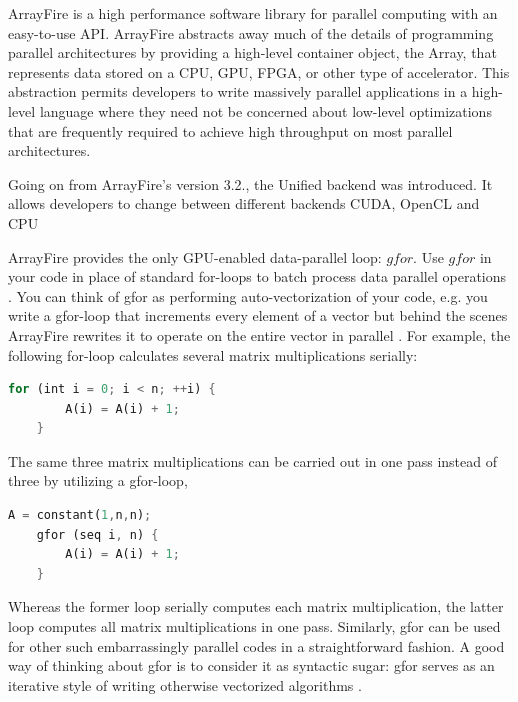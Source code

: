 ArrayFire is a high performance software library for parallel computing with an easy-to-use API. ArrayFire abstracts away much of the details of programming parallel architectures by providing a high-level container object, the Array, that represents data stored on a CPU, GPU, FPGA, or other type of accelerator. This abstraction permits developers to write massively parallel applications in a high-level language where they need not be concerned about low-level optimizations that are frequently required to achieve high throughput on most parallel architectures.

\citep{Yalamanchili2015}

Going on from ArrayFire's version 3.2., the Unified backend was introduced. It allows developers to change between different backends CUDA, OpenCL and CPU

ArrayFire provides the only GPU-enabled data-parallel loop: $gfor$. Use $gfor$ in your code in place of standard for-loops to batch process data parallel operations \citep{malcolmArrayFireGPUAcceleration2012}. 
You can think of gfor as performing auto-vectorization of your code, e.g. you write a gfor-loop that increments every element of a vector but behind the scenes ArrayFire rewrites it to operate on the entire vector in parallel \citep{Yalamanchili2015}. For example, the following for-loop calculates several matrix multiplications serially:

\begin{lstlisting}[language=Rust, caption=Pseudo-code with imerative for loop]
	for (int i = 0; i < n; ++i) {
		A(i) = A(i) + 1;
	}
\end{lstlisting}

The same three matrix multiplications can be carried out in one pass instead of three by utilizing a gfor-loop,

\begin{lstlisting}[language=Rust, caption=Pseudo-code with if-statement removed]
	A = constant(1,n,n);
	gfor (seq i, n) {
		A(i) = A(i) + 1;
	}
\end{lstlisting}

Whereas the former loop serially computes each matrix multiplication, the latter loop computes all matrix multiplications in one pass. Similarly, gfor can be used for other such embarrassingly parallel codes in a straightforward fashion. A good way of thinking about gfor is to consider it as syntactic sugar: gfor serves as an iterative style of writing otherwise vectorized algorithms \citep{malcolmArrayFireGPUAcceleration2012}.

